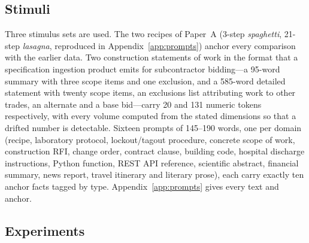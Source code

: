 \documentclass[11pt]{article}
\begin{document}
\subsection{Stimuli}
\label{sec:stimuli}

Three stimulus sets are used. The two recipes of Paper~A (3-step
\emph{spaghetti}, 21-step \emph{lasagna}, reproduced in
Appendix~\ref{app:prompts}) anchor every comparison with the earlier data.
Two construction statements of work in the format that a specification
ingestion product emits for subcontractor bidding---a 95-word summary with
three scope items and one exclusion, and a 585-word detailed statement with
twenty scope items, an exclusions list attributing work to other trades, an
alternate and a base bid---carry 20 and 131 numeric tokens respectively,
with every volume computed from the stated dimensions so that a drifted
number is detectable. Sixteen prompts of 145--190 words, one per domain
(recipe, laboratory protocol, lockout/tagout procedure, concrete scope of
work, construction RFI, change order, contract clause, building code,
hospital discharge instructions, Python function, REST API reference,
scientific abstract, financial summary, news report, travel itinerary and
literary prose), each carry exactly ten anchor facts tagged by type.
Appendix~\ref{app:prompts} gives every text and anchor.

\subsection{Experiments}
\label{sec:design}
\end{document}
